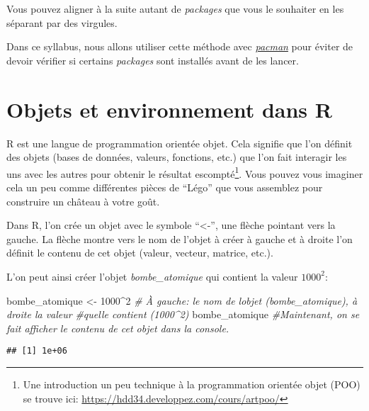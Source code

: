 \documentclass[
]{book}
\newenvironment{Shaded}{\begin{snugshade}}{\end{snugshade}}
\newcommand{\CommentTok}[1]{\textcolor[rgb]{0.56,0.35,0.01}{\textit{#1}}}
\newcommand{\DecValTok}[1]{\textcolor[rgb]{0.00,0.00,0.81}{#1}}
\newcommand{\NormalTok}[1]{#1}
\newcommand{\OtherTok}[1]{\textcolor[rgb]{0.56,0.35,0.01}{#1}}
\newcommand{\SpecialCharTok}[1]{\textcolor[rgb]{0.00,0.00,0.00}{#1}}
\begin{document}
Vous pouvez aligner à la suite autant de \emph{packages} que vous le souhaiter en les séparant par des virgules.

Dans ce syllabus, nous allons utiliser cette méthode avec \href{http://trinker.github.io/pacman/vignettes/Introduction_to_pacman.html}{\emph{pacman}} pour éviter de devoir vérifier si certains \emph{packages} sont installés avant de les lancer.

\hypertarget{objets_envir}{%
\section{Objets et environnement dans R}\label{objets_envir}}

R est une langue de programmation orientée objet. Cela signifie que l'on définit des objets (bases de données, valeurs, fonctions, etc.) que l'on fait interagir les uns avec les autres pour obtenir le résultat escompté\footnote{Une introduction un peu technique à la programmation orientée objet (POO) se trouve ici: \url{https://hdd34.developpez.com/cours/artpoo/}}. Vous pouvez vous imaginer cela un peu comme différentes pièces de ``Légo'' que vous assemblez pour construire un château à votre goût.

Dans R, l'on crée un objet avec le symbole ``\textless-'', une flèche pointant vers la gauche. La flèche montre vers le nom de l'objet à créer à gauche et à droite l'on définit le contenu de cet objet (valeur, vecteur, matrice, etc.).

L'on peut ainsi créer l'objet \emph{bombe\_atomique} qui contient la valeur \(1000^2\):

\begin{Shaded}
\begin{Highlighting}[]
\NormalTok{bombe\_atomique }\OtherTok{\textless{}{-}} \DecValTok{1000}\SpecialCharTok{\^{}}\DecValTok{2} \CommentTok{\# À gauche: le nom de l\textquotesingle{}objet (bombe\_atomique), à droite la valeur}
                         \CommentTok{\#qu\textquotesingle{}elle contient (1000\^{}2)}
\NormalTok{bombe\_atomique           }\CommentTok{\#Maintenant, on se fait afficher le contenu de cet objet dans la console.}
\end{Highlighting}
\end{Shaded}

\begin{verbatim}
## [1] 1e+06
\end{verbatim}
\end{document}
